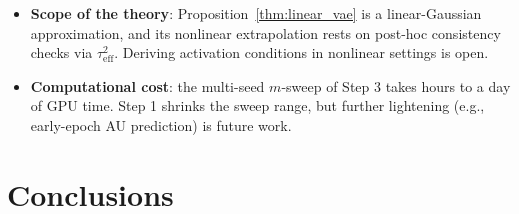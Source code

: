\documentclass[make,article,submit,pdftex,moreauthors]{Definitions/mdpi}
\begin{document}
\begin{itemize}
        diverse data is future work.
  \item \textbf{Scope of the theory}: Proposition~\ref{thm:linear_vae} is a
        linear-Gaussian approximation, and its nonlinear extrapolation rests
        on post-hoc consistency checks via $\tau^2_{\mathrm{eff}}$.
        Deriving activation conditions in nonlinear settings is open.
  \item \textbf{Computational cost}: the multi-seed $m$-sweep of Step 3
        takes hours to a day of GPU time.
        Step 1 shrinks the sweep range, but further lightening (e.g.,
        early-epoch AU prediction) is future work.
\end{itemize}

\section{Conclusions}\label{sec:conclusion}
\end{document}
